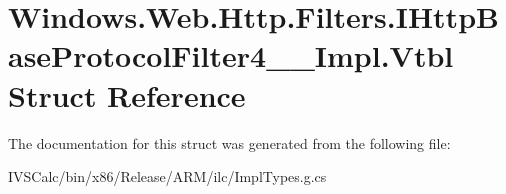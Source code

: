 \hypertarget{struct_windows_1_1_web_1_1_http_1_1_filters_1_1_i_http_base_protocol_filter4_____impl_1_1_vtbl}{}\section{Windows.\+Web.\+Http.\+Filters.\+I\+Http\+Base\+Protocol\+Filter4\+\_\+\+\_\+\+Impl.\+Vtbl Struct Reference}
\label{struct_windows_1_1_web_1_1_http_1_1_filters_1_1_i_http_base_protocol_filter4_____impl_1_1_vtbl}


The documentation for this struct was generated from the following file\+:\begin{DoxyCompactItemize}
\item 
I\+V\+S\+Calc/bin/x86/\+Release/\+A\+R\+M/ilc/Impl\+Types.\+g.\+cs\end{DoxyCompactItemize}
